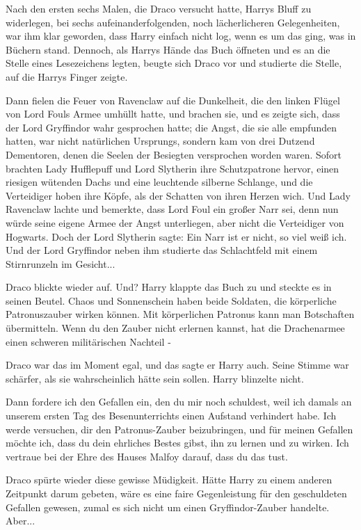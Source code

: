 Nach den ersten sechs Malen, die Draco versucht hatte, Harrys Bluff zu
widerlegen, bei sechs aufeinanderfolgenden, noch lächerlicheren Gelegenheiten,
war ihm klar geworden, dass Harry einfach nicht log, wenn es um das ging, was in
Büchern stand. Dennoch, als Harrys Hände das Buch öffneten und es an die Stelle
eines Lesezeichens legten, beugte sich Draco vor und studierte die Stelle, auf
die Harrys Finger zeigte.

Dann fielen die Feuer von Ravenclaw auf die Dunkelheit, die den linken Flügel
von Lord Fouls Armee umhüllt hatte, und brachen sie, und es zeigte sich, dass
der Lord Gryffindor wahr gesprochen hatte; die Angst, die sie alle empfunden
hatten, war nicht natürlichen Ursprungs, sondern kam von drei Dutzend
Dementoren, denen die Seelen der Besiegten versprochen worden waren. Sofort
brachten Lady Hufflepuff und Lord Slytherin ihre Schutzpatrone hervor, einen
riesigen wütenden Dachs und eine leuchtende silberne Schlange, und die
Verteidiger hoben ihre Köpfe, als der Schatten von ihren Herzen wich. Und Lady
Ravenclaw lachte und bemerkte, dass Lord Foul ein großer Narr sei, denn nun
würde seine eigene Armee der Angst unterliegen, aber nicht die Verteidiger von
Hogwarts. Doch der Lord Slytherin sagte: \glqq Ein Narr ist er nicht, so viel
weiß ich.\grqq{} Und der Lord Gryffindor neben ihm studierte das Schlachtfeld
mit einem Stirnrunzeln im Gesicht...

Draco blickte wieder auf. \glqq Und?\grqq{} Harry klappte das Buch zu und
steckte es in seinen Beutel. \glqq Chaos und Sonnenschein haben beide Soldaten,
die körperliche Patronuszauber wirken können. Mit körperlichen Patronus kann man
Botschaften übermitteln. Wenn du den Zauber nicht erlernen kannst, hat die
Drachenarmee einen schweren militärischen Nachteil -\grqq{}

Draco war das im Moment egal, und das sagte er Harry auch. Seine Stimme war
schärfer, als sie wahrscheinlich hätte sein sollen. Harry blinzelte nicht.

\glqq Dann fordere ich den Gefallen ein, den du mir noch schuldest, weil ich
damals an unserem ersten Tag des Besenunterrichts einen Aufstand verhindert
habe. Ich werde versuchen, dir den Patronus-Zauber beizubringen, und für meinen
Gefallen möchte ich, dass du dein ehrliches Bestes gibst, ihn zu lernen und zu
wirken. Ich vertraue bei der Ehre des Hauses Malfoy darauf, dass du das
tust.\grqq{}

Draco spürte wieder diese gewisse Müdigkeit. Hätte Harry zu einem anderen
Zeitpunkt darum gebeten, wäre es eine faire Gegenleistung für den geschuldeten
Gefallen gewesen, zumal es sich nicht um einen Gryffindor-Zauber handelte.
Aber...

